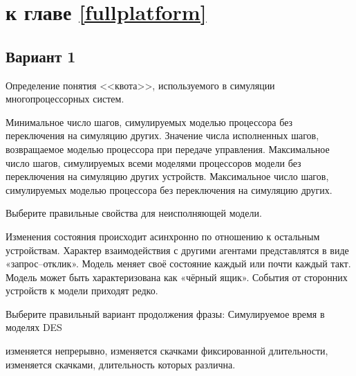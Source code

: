 
\section{\Questions к главе \ref{fullplatform}} %

\subsection*{Вариант 1}

\begin{questions}

\question[3] Определение понятия <<квота>>, используемого в симуляции многопроцессорных систем.
\begin{choices}
    \choice Минимальное число шагов, симулируемых моделью процессора без переключения на симуляцию других.
    \choice Значение числа исполненных шагов, возвращаемое моделью процессора при передаче управления.
    \choice Максимальное число шагов, симулируемых всеми моделями процессоров модели без переключения на симуляцию других устройств.
    \correctchoice Максимальное число шагов, симулируемых моделью процессора без переключения на симуляцию других.
\end{choices}


\question[3] Выберите правильные свойства для неисполняющей модели.
\begin{choices}
    \correctchoice Изменения состояния происходит асинхронно по отношению к остальным устройствам.
    \correctchoice Характер взаимодействия с другими агентами представлятся в виде «запрос--отклик».
    \choice Модель меняет своё состояние каждый или почти каждый такт.
    \correctchoice Модель может быть характеризована как «чёрный ящик».
    \choice События от сторонних устройств к модели приходят редко.
\end{choices}

\question[3] Выберите правильный вариант продолжения фразы: Симулируемое время в моделях DES 
\begin{choices}
    \choice изменяется непрерывно,
    \choice изменяется скачками фиксированной длительности,
    \correctchoice изменяется скачками, длительность которых различна.
\end{choices}
    

\end{questions}
